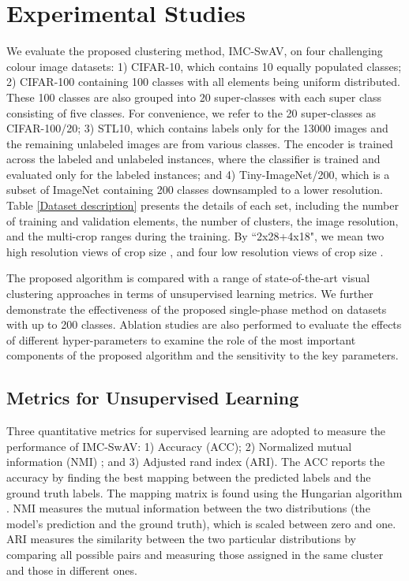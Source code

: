 \documentclass[journal]{IEEEtran}
\begin{document}
\section{Experimental Studies}
\label{sec:results}

We evaluate the proposed clustering method, IMC-SwAV, on  four challenging colour image datasets: 1) CIFAR-10, which contains 10 equally populated classes; 2) CIFAR-100 containing 100 classes with all elements being uniform distributed. These 100 classes are also grouped into 20 super-classes with each super class consisting of five classes. For convenience, we refer to the 20 super-classes as CIFAR-100/20; 3) STL10, which contains labels only for the 13000 images and the remaining unlabeled images are from various classes. The encoder is trained across the labeled and unlabeled instances, where the classifier is trained and evaluated only for the labeled instances; and 4) Tiny-ImageNet/200, which is a subset of ImageNet containing 200 classes downsampled to a lower resolution.  Table \ref{Dataset description} presents the details of each set, including the number of training and validation elements, the number of clusters, the image resolution, and the multi-crop ranges during the training. By ``2x28+4x18", we mean two high resolution views of crop size , and four low resolution views of crop size . 

The proposed algorithm is compared with a range of state-of-the-art visual clustering approaches in terms of unsupervised learning metrics. We further demonstrate the effectiveness of the proposed single-phase method on datasets with up to 200 classes. Ablation studies are also performed to evaluate the effects of different hyper-parameters to examine the role of the most important components of the proposed algorithm and the sensitivity to the key parameters.

\subsection{Metrics for Unsupervised Learning}

Three quantitative  metrics for supervised learning are adopted to measure the performance of IMC-SwAV: 1) Accuracy (ACC); 2) Normalized mutual information (NMI) \cite{vinh2009information}; and 3) Adjusted rand index (ARI). The ACC reports the accuracy by finding the best mapping between the predicted labels and the ground truth labels. The mapping matrix is found using the Hungarian algorithm \cite{doi:10.1002/nav.3800020109}. NMI measures the mutual information between the two distributions (the model's prediction and the ground truth), which is scaled between zero and one. ARI measures the similarity between the two particular distributions by comparing all possible pairs and measuring those assigned in the same cluster and those in different ones.
\end{document}
